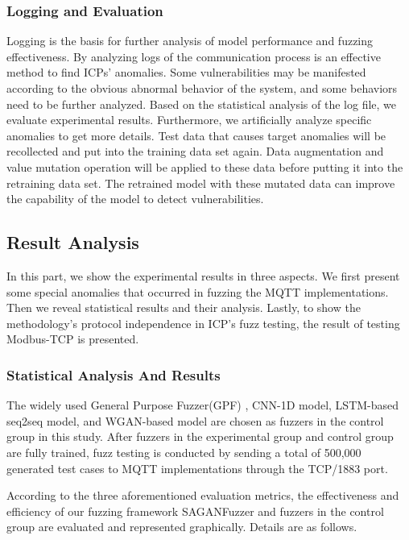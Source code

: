 \subsubsection{Logging and Evaluation}
Logging is the basis for further analysis of model performance and fuzzing effectiveness. By analyzing logs of the communication process is an effective method to find ICPs’ anomalies. Some vulnerabilities may be manifested according to the obvious abnormal behavior of the system, and some behaviors need to be further analyzed. Based on the statistical analysis of the log file, we evaluate experimental results. Furthermore, we artificially analyze specific anomalies to get more details. Test data that causes target anomalies will be recollected and put into the training data set again. Data augmentation and value mutation operation will be applied to these data before putting it into the retraining data set. The retrained model with these mutated data can improve the capability of the model to detect vulnerabilities.

\subsection{Result Analysis}
In this part, we show the experimental results in three aspects. We first present some special anomalies that occurred in fuzzing the MQTT implementations. Then we reveal statistical results and their analysis. Lastly, to show the methodology’s protocol independence in ICP’s fuzz testing, the result of testing Modbus-TCP is presented.

\subsubsection{Statistical Analysis And Results}
The widely used General Purpose Fuzzer(GPF) \cite{demott2007revolutionizing}, CNN-1D model, LSTM-based seq2seq model, and WGAN-based model are chosen as fuzzers in the control group in this study. After fuzzers in the experimental group and control group are fully trained, fuzz testing is conducted by sending a total of 500,000 generated test cases to MQTT implementations through the TCP/1883 port.

According to the three aforementioned evaluation metrics, the effectiveness and efficiency of our fuzzing framework SAGANFuzzer and fuzzers in the control group are evaluated and represented graphically. Details are as follows.  

